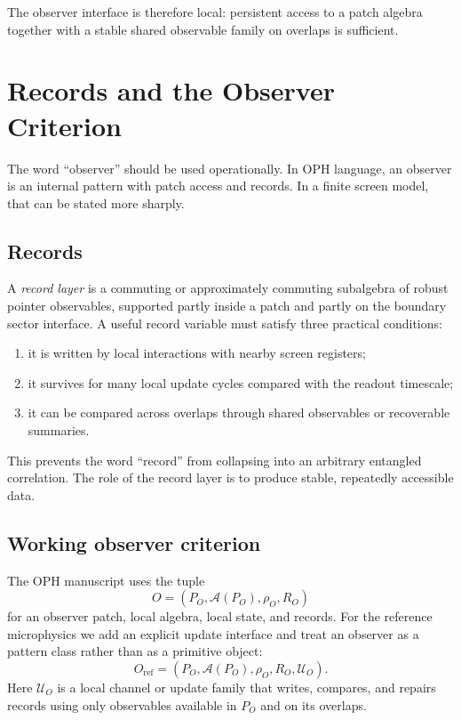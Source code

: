 \documentclass[11pt]{article}
\begin{document}
The observer interface is therefore local: persistent access to a patch algebra together with a
stable shared observable family on overlaps is sufficient.

\section{Records and the Observer Criterion}

The word ``observer'' should be used operationally. In OPH language, an observer is an
internal pattern with patch access and records. In a finite screen model, that can be stated
more sharply.

\subsection{Records}

A \emph{record layer} is a commuting or approximately commuting subalgebra of robust pointer
observables, supported partly inside a patch and partly on the boundary sector interface. A
useful record variable must satisfy three practical conditions:
\begin{enumerate}[leftmargin=2em]
\item it is written by local interactions with nearby screen registers;
\item it survives for many local update cycles compared with the readout timescale;
\item it can be compared across overlaps through shared observables or recoverable summaries.
\end{enumerate}

This prevents the word ``record'' from collapsing into an arbitrary entangled correlation.
The role of the record layer is to produce stable, repeatedly accessible data.

\subsection{Working observer criterion}

The OPH manuscript uses the tuple
\begin{equation}
O=(P_O,\mathcal A(P_O),\rho_O,R_O)
\end{equation}
for an observer patch, local algebra, local state, and records. For the reference
microphysics we add an explicit update interface and treat an observer as a pattern class
rather than as a primitive object:
\begin{equation}
O_{\mathrm{ref}}=(P_O,\mathcal A(P_O),\rho_O,R_O,\mathcal U_O).
\end{equation}
Here $\mathcal U_O$ is a local channel or update family that writes, compares, and repairs
records using only observables available in $P_O$ and on its overlaps.
\end{document}
